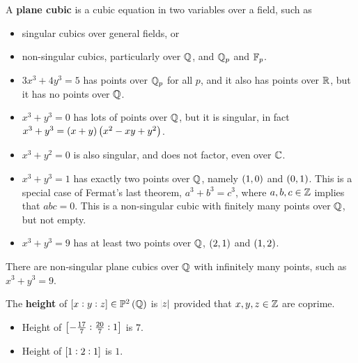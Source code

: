 
\begin{definition}
A \textbf{plane cubic} is a cubic equation in two variables over a field, such as
\begin{itemize}
\item singular cubics over general fields, or
\item non-singular cubics, particularly over $ \mathbb{Q} $, and $ \mathbb{Q}_p $ and $ \mathbb{F}_p $.
\end{itemize}
\end{definition}

\begin{example*}
\hfill
\begin{itemize}
\item $ 3x^3 + 4y^3 = 5 $ has points over $ \mathbb{Q}_p $ for all $ p $, and it also has points over $ \mathbb{R} $, but it has no points over $ \mathbb{Q} $.
\item $ x^3 + y^3 = 0 $ has lots of points over $ \mathbb{Q} $, but it is singular, in fact $ x^3 + y^3 = \br{x + y}\br{x^2 - xy + y^2} $.
\item $ x^3 + y^2 = 0 $ is also singular, and does not factor, even over $ \mathbb{C} $.
\item $ x^3 + y^3 = 1 $ has exactly two points over $ \mathbb{Q} $, namely $ \br{1, 0} $ and $ \br{0, 1} $. This is a special case of Fermat's last theorem, $ a^3 + b^3 = c^3 $, where $ a, b, c \in \mathbb{Z} $ implies that $ abc = 0 $. This is a non-singular cubic with finitely many points over $ \mathbb{Q} $, but not empty.
\item $ x^3 + y^3 = 9 $ has at least two points over $ \mathbb{Q} $, $ \br{2, 1} $ and $ \br{1, 2} $.
\end{itemize}
\end{example*}

\begin{lemma}
There are non-singular plane cubics over $ \mathbb{Q} $ with infinitely many points, such as $ x^3 + y^3 = 9 $.
\end{lemma}

The \textbf{height} of $ \sbr{x : y : z} \in \PP^2\br{\QQ} $ is $ \abs{z} $ provided that $ x, y, z \in \mathbb{Z} $ are coprime.

\begin{example*}
\hfill
\begin{itemize}
\item Height of $ \sbr{-\tfrac{17}{7} : \tfrac{20}{7} : 1} $ is $ 7 $.
\item Height of $ \sbr{1 : 2 : 1} $ is $ 1 $.
\end{itemize}
\end{example*}

